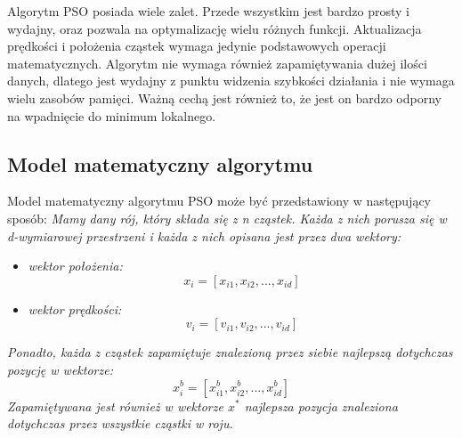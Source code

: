 Algorytm PSO posiada wiele zalet. Przede wszystkim jest bardzo prosty i wydajny, oraz pozwala na optymalizację wielu różnych funkcji. Aktualizacja prędkości i położenia cząstek wymaga jedynie podstawowych operacji matematycznych. Algorytm nie wymaga również zapamiętywania dużej ilości danych, dlatego jest wydajny z punktu widzenia szybkości działania i nie wymaga wielu zasobów pamięci. Ważną cechą jest również to, że jest on bardzo odporny na wpadnięcie do minimum lokalnego.

\subsection{Model matematyczny algorytmu}
Model matematyczny algorytmu PSO może być przedstawiony w następujący sposób:
\newline
\textit{Mamy dany rój, który składa się z n cząstek. Każda z nich porusza się w d-wymiarowej przestrzeni i każda z nich opisana jest przez dwa wektory:}

\begin{itemize}
\item\textit{wektor położenia:}
\newline
\begin{equation}
x_i = [x_{i1},x_{i2},...,x_{id}]
\end{equation}
\newline
\item\textit{wektor prędkości:}
\newline
\begin{equation}
v_i = [v_{i1},v_{i2},...,v_{id}]
\end{equation}
\newline
\end{itemize}

\textit{Ponadto, każda z cząstek zapamiętuje znalezioną przez siebie najlepszą dotychczas pozycję w wektorze:}
\newline
\begin{equation}
x_i^b=[x_{i1}^b,x_{i2}^b,...,x_{id}^b]
\end{equation} 
\newline
\textit{Zapamiętywana jest również w wektorze $x^*$ najlepsza pozycja znaleziona dotychczas przez wszystkie cząstki w roju.}

